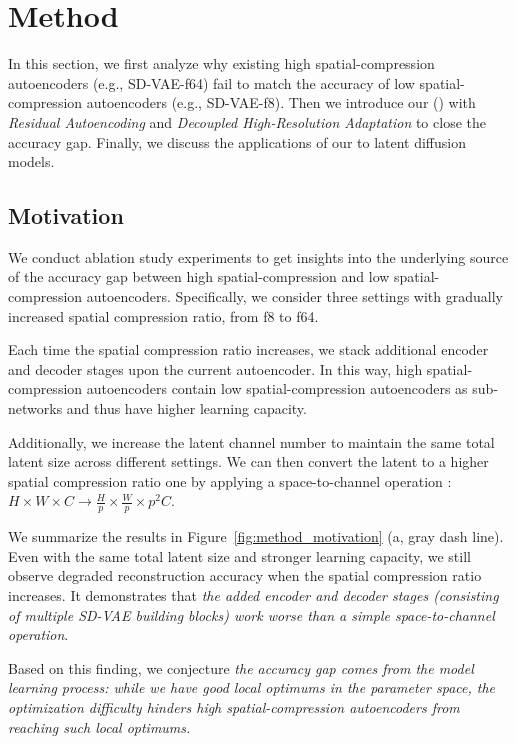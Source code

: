 

\section{Method}
\label{sec:method}
\vspace{-5pt}
In this section, we first analyze why existing high spatial-compression autoencoders (e.g., SD-VAE-f64) fail to match the accuracy of low spatial-compression autoencoders (e.g., SD-VAE-f8). Then we introduce our \modelfull (\modelshort) with \emph{Residual Autoencoding} and \emph{Decoupled High-Resolution Adaptation} to close the accuracy gap. Finally, we discuss the applications of our \modelshort to latent diffusion models. 

\subsection{Motivation}\label{sec:motivation}
We conduct ablation study experiments to get insights into the underlying source of the accuracy gap between high spatial-compression and low spatial-compression autoencoders. Specifically, we consider three settings with gradually increased spatial compression ratio, from f8 to f64. 

Each time the spatial compression ratio increases, we stack additional encoder and decoder stages upon the current autoencoder. In this way, high spatial-compression autoencoders contain low spatial-compression autoencoders as sub-networks and thus have higher learning capacity.

Additionally, we increase the latent channel number to maintain the same total latent size across different settings. We can then convert the latent to a higher spatial compression ratio one by applying a space-to-channel operation \citep{shi2016real}: $H \times W \times C \rightarrow \frac{H}{p} \times \frac{W}{p} \times p^2C$. 

We summarize the results in Figure~\ref{fig:method_motivation} (a, gray dash line). Even with the same total latent size and stronger learning capacity, we still observe degraded reconstruction accuracy when the spatial compression ratio increases. It demonstrates that \emph{the added encoder and decoder stages (consisting of multiple SD-VAE building blocks) work worse than a simple space-to-channel operation}. 

Based on this finding, we conjecture \emph{the accuracy gap comes from the model learning process: while we have good local optimums in the parameter space, the optimization difficulty hinders high spatial-compression autoencoders from reaching such local optimums.}

